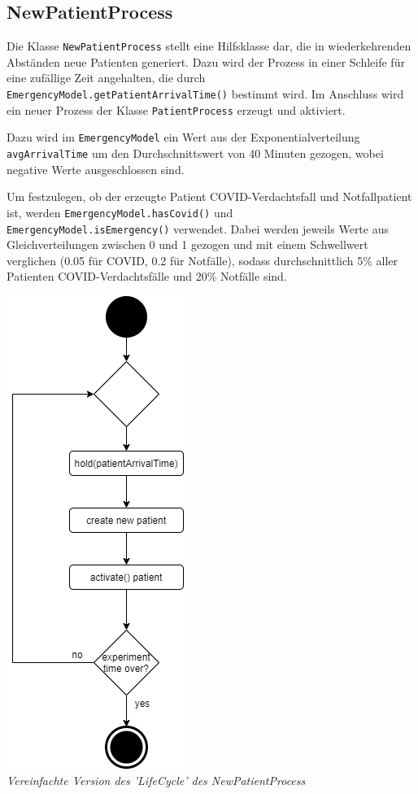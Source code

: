 \documentclass{article}
\begin{document}
\subsection{NewPatientProcess}

Die Klasse \texttt{NewPatientProcess} stellt eine Hilfsklasse dar, die in wiederkehrenden Abständen neue Patienten generiert. Dazu wird der Prozess in einer Schleife für eine zufällige Zeit angehalten, die durch \\ \texttt{EmergencyModel.getPatientArrivalTime()} bestimmt wird. Im Anschluss wird ein neuer Prozess der Klasse \texttt{PatientProcess} erzeugt und aktiviert. 

Dazu wird im \texttt{EmergencyModel} ein Wert aus der Exponentialverteilung \\ \texttt{avgArrivalTime} um den Durchschnittswert von 40 Minuten gezogen, wobei negative Werte ausgeschlossen sind.

Um festzulegen, ob der erzeugte Patient COVID-Verdachtsfall und Notfallpatient ist, werden \texttt{EmergencyModel.hasCovid()} und \\ \texttt{EmergencyModel.isEmergency()} verwendet. Dabei werden jeweils Werte aus Gleichverteilungen zwischen 0 und 1 gezogen und mit einem Schwellwert verglichen (0.05 für COVID, 0.2 für Notfälle), sodass durchschnittlich 5\% aller Patienten COVID-Verdachtsfälle und 20\% Notfälle sind.

\begin{center}
\includegraphics[scale=0.55]{img/newPatientProcess.png} \\
\textit{Vereinfachte Version des 'LifeCycle' des NewPatientProcess}
\end{center}
\end{document}
